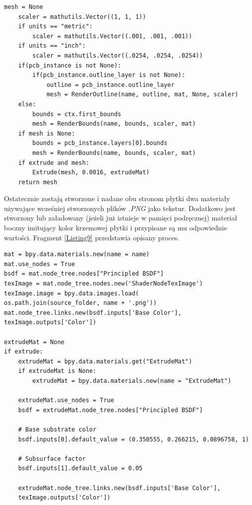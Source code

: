 \documentclass{xmgr}
\begin{document}
\begin{lstlisting}
mesh = None
    scaler = mathutils.Vector((1, 1, 1))
    if units == "metric":
        scaler = mathutils.Vector((.001, .001, .001))
    if units == "inch":
        scaler = mathutils.Vector((.0254, .0254, .0254))
    if(pcb_instance is not None):
        if(pcb_instance.outline_layer is not None):
            outline = pcb_instance.outline_layer
            mesh = RenderOutline(name, outline, mat, None, scaler)
    else:
        bounds = ctx.first_bounds
        mesh = RenderBounds(name, bounds, scaler, mat)
    if mesh is None:
        bounds = pcb_instance.layers[0].bounds
        mesh = RenderBounds(name, bounds, scaler, mat)
    if extrude and mesh:
        Extrude(mesh, 0.0016, extrudeMat)
    return mesh
\end{lstlisting}

\newpage

Ostatecznie zostają stworzone i nadane obu stronom płytki dwa materiały używające wcześniej stworzonych plików \emph{.PNG} jako tekstur. Dodatkowo jest stworzony lub załadowany (jeżeli już istnieje w pamięci podręcznej) materiał boczny imitujący kolor krzemowej płytki i przypisane są mu odpowiednie wartości. Fragment \ref{Listing9} przedstawia opisany proces.

\begin{lstlisting}
mat = bpy.data.materials.new(name = name)
mat.use_nodes = True
bsdf = mat.node_tree.nodes["Principled BSDF"]
texImage = mat.node_tree.nodes.new('ShaderNodeTexImage')
texImage.image = bpy.data.images.load(
os.path.join(source_folder, name + '.png'))
mat.node_tree.links.new(bsdf.inputs['Base Color'],
texImage.outputs['Color'])

extrudeMat = None
if extrude:
    extrudeMat = bpy.data.materials.get("ExtrudeMat")
    if extrudeMat is None:
        extrudeMat = bpy.data.materials.new(name = "ExtrudeMat")

    extrudeMat.use_nodes = True
    bsdf = extrudeMat.node_tree.nodes["Principled BSDF"]

    # Base substrate color
    bsdf.inputs[0].default_value = (0.350555, 0.266215, 0.0896758, 1)

    # Subsurface factor
    bsdf.inputs[1].default_value = 0.05

    extrudeMat.node_tree.links.new(bsdf.inputs['Base Color'],
    texImage.outputs['Color'])
\end{lstlisting}
\end{document}
